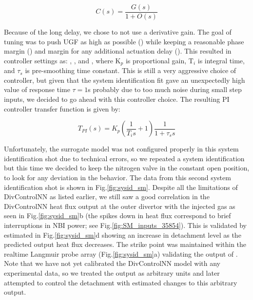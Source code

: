 \begin{equation}
 C(s) = \frac{G(s)}{1 + O(s)}
\label{eq:cltf}
\end{equation}



Because of the long delay, we chose to not use a derivative gain.
The goal of tuning was to push \ac{UGF} as high as possible (\AfracUGF) while keeping a reasonable phase margin (\AfracPhaseMargin) and margin for any additional actuation delay (\AfracDelayMargin).
This resulted in controller settings as: \AfracKp, \AfracTi, and \Afracstau, where K$_p$ is proportional gain, T$_i$ is integral time, and $\tau_s$ is pre-smoothing time constant.
This is still a very aggressive choice of controller, but given that the system identification fit gave an unexpectedly high value of response time $\tau=1$s probably due to too much noise during small step inputs, we decided to go ahead with this controller choice.
The resulting PI controller transfer function is given by:

\begin{equation}
 T_{PI}(s) = K_p \left( \frac{1}{T_i s} + 1\right) \frac{1}{1 + \tau_s s}
\label{eq:PI}
\end{equation}

Unfortunately, the surrogate model was not configured properly in this system identification shot due to technical errors, so we repeated a system identification but this time we decided to keep the nitrogen valve in the constant open position, to look for any deviation in the behavior.
The data from this second system identification shot is shown in Fig.\ref{fig:sysid_sm}.
Despite all the limitations of DivControlNN as listed earlier, we still saw a good correlation in the DivControlNN heat flux output at the outer divertor with the injected gas as seen in Fig.\ref{fig:sysid_sm}b (the spikes down in heat flux correspond to brief interruptions in NBI power; see Fig.\ref{fig:SM_inputs_35854}).
This is validated by estimated \Afrac in Fig.\ref{fig:sysid_sm}d showing an increase in detachment level as the predicted output heat flux decreases.
The strike point was maintained within the realtime Langmuir probe array (Fig.\ref{fig:sysid_sm}a) validating the output of \Afrac{}.
Note that we have not yet calibrated the DivControlNN model with any experimental data, so we treated the output as arbitrary units and later attempted to control the detachment with estimated changes to this arbitrary output.

